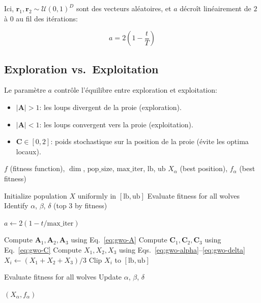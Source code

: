 \documentclass[12pt,a4paper,oneside]{report}
\begin{document}
Ici, $\mathbf{r}_1, \mathbf{r}_2 \sim \mathcal{U}(0,1)^D$ sont des vecteurs al\'eatoires, et $a$ d\'ecro\^it lin\'eairement de $2$ \`a $0$ au fil des it\'erations:

\begin{equation}
a = 2\left(1 - \frac{t}{T}\right) \label{eq:gwo-a}
\end{equation}

\subsection{Exploration vs.\ Exploitation}

Le param\`etre $a$ contr\^ole l'\'equilibre entre exploration et exploitation:
\begin{itemize}
    \item $|\mathbf{A}| > 1$: les loups divergent de la proie (exploration).
    \item $|\mathbf{A}| < 1$: les loups convergent vers la proie (exploitation).
    \item $\mathbf{C} \in [0, 2]$: poids stochastique sur la position de la proie (\'evite les optima locaux).
\end{itemize}

\begin{algorithm}[H]
\caption{Optimiseur \`a Loups Gris}
\begin{algorithmic}[1]
\Require $f$ (fitness function), $\dim$, $\text{pop\_size}$, $\text{max\_iter}$, $\text{lb}$, $\text{ub}$
\Ensure $X_\alpha$ (best position), $f_\alpha$ (best fitness)

\State Initialize population $X$ uniformly in $[\text{lb}, \text{ub}]$
\State Evaluate fitness for all wolves
\State Identify $\alpha$, $\beta$, $\delta$ (top 3 by fitness)

    \State $a \gets 2(1 - t/\text{max\_iter})$

        \State Compute $\mathbf{A}_1, \mathbf{A}_2, \mathbf{A}_3$ using Eq.~\ref{eq:gwo-A}
        \State Compute $\mathbf{C}_1, \mathbf{C}_2, \mathbf{C}_3$ using Eq.~\ref{eq:gwo-C}
        \State Compute $X_1, X_2, X_3$ using Eqs.~\ref{eq:gwo-alpha}--\ref{eq:gwo-delta}
        \State $X_i \gets (X_1 + X_2 + X_3) / 3$
        \State Clip $X_i$ to $[\text{lb}, \text{ub}]$
    \EndFor

    \State Evaluate fitness for all wolves
    \State Update $\alpha$, $\beta$, $\delta$
\EndFor

\State \Return $(X_\alpha, f_\alpha)$
\end{algorithmic}
\end{algorithm}
\end{document}

